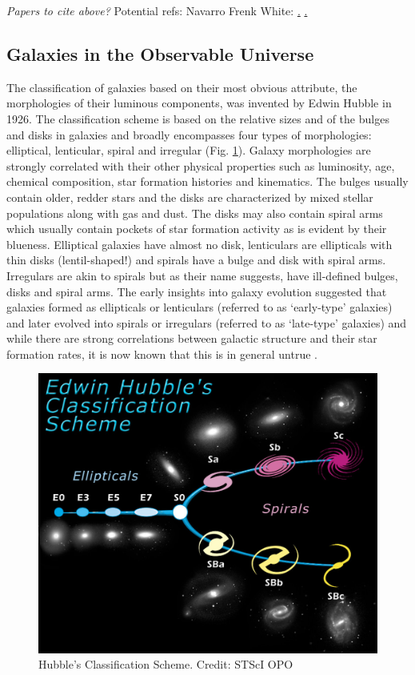 \emph{Papers to cite above?}
Potential refs:
Navarro Frenk White: \href{http://iopscience.iop.org/article/10.1086/304888/meta}.
\href{http://adsabs.harvard.edu/doi/10.1086/156499}.

\subsection{Galaxies in the Observable Universe}

The classification of galaxies based on their most obvious attribute, the morphologies of their luminous components, was invented by Edwin Hubble in 1926. The classification scheme is based on the relative sizes and of the bulges and disks in galaxies and broadly encompasses four types of morphologies: elliptical, lenticular, spiral and irregular (Fig. \ref{fig:hubble_classification}). Galaxy morphologies are strongly correlated with their other physical properties such as luminosity, age, chemical composition, star formation histories and kinematics. The bulges usually contain older, redder stars and the disks are characterized by mixed stellar populations along with gas and dust. The disks may also contain spiral arms which usually contain pockets of star formation activity as is evident by their blueness. Elliptical galaxies have almost no disk, lenticulars are ellipticals with thin disks (lentil-shaped!) and spirals have a bulge and disk with spiral arms. Irregulars are akin to spirals but as their name suggests, have ill-defined bulges, disks and spiral arms. The early insights into galaxy evolution suggested that galaxies formed as ellipticals or lenticulars (referred to as `early-type' galaxies) and later evolved into spirals or irregulars (referred to as `late-type' galaxies) and while there are strong correlations between galactic structure and their star formation rates, it is now known that this is in general untrue .\\


\begin{figure}
\includegraphics[width=\textwidth]{figures/hubble}
\caption[Short figure name.]{ Hubble's Classification Scheme. Credit: STScI OPO
\label{fig:hubble_classification}}
\end{figure}

